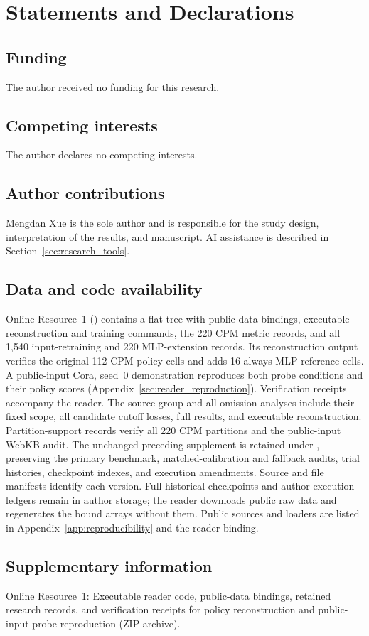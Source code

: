 \documentclass[pdflatex,sn-basic,Numbered]{sn-jnl}
\begin{document}
\FloatBarrier
\backmatter
\section*{Statements and Declarations}
\subsection*{Funding}
The author received no funding for this research.
\subsection*{Competing interests}
The author declares no competing interests.
\subsection*{Author contributions}
Mengdan Xue is the sole author and is responsible for the study design, interpretation of the results, and manuscript. AI assistance is described in Section~\ref{sec:research_tools}.
\subsection*{Data and code availability}
Online Resource~1 () contains a flat  tree with public-data bindings, executable reconstruction and training commands, the 220 CPM metric records, and all 1,540 input-retraining and 220 MLP-extension records. Its reconstruction output verifies the original 112 CPM policy cells and adds 16 always-MLP reference cells. A public-input Cora, seed~0 demonstration reproduces both probe conditions and their policy scores (Appendix~\ref{sec:reader_reproduction}). Verification receipts accompany the reader. The source-group and all-omission analyses include their fixed scope, all candidate cutoff losses, full results, and executable reconstruction. Partition-support records verify all 220 CPM partitions and the public-input WebKB audit. The unchanged preceding supplement is retained under , preserving the primary benchmark, matched-calibration and fallback audits, trial histories, checkpoint indexes, and execution amendments. Source and file manifests identify each version. Full historical checkpoints and author execution ledgers remain in author storage; the reader downloads public raw data and regenerates the bound arrays without them. Public sources and loaders are listed in Appendix~\ref{app:reproducibility} and the reader binding.
\subsection*{Supplementary information}
Online Resource~1: Executable reader code, public-data bindings, retained research records, and verification receipts for policy reconstruction and public-input probe reproduction (ZIP archive).
\end{document}
